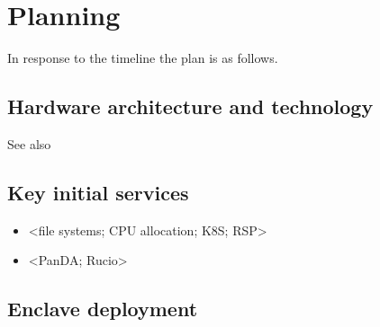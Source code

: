 \section{Planning}\label{sec:plan}

In response to the timeline  the plan is as follows.

\subsection {Hardware architecture and technology}
See also 

\subsection{Key initial services}

\begin{itemize}
\item <file systems; CPU allocation; K8S; \gls{RSP}>

\item <PanDA; Rucio>

\end{itemize}

\subsection {Enclave deployment}
